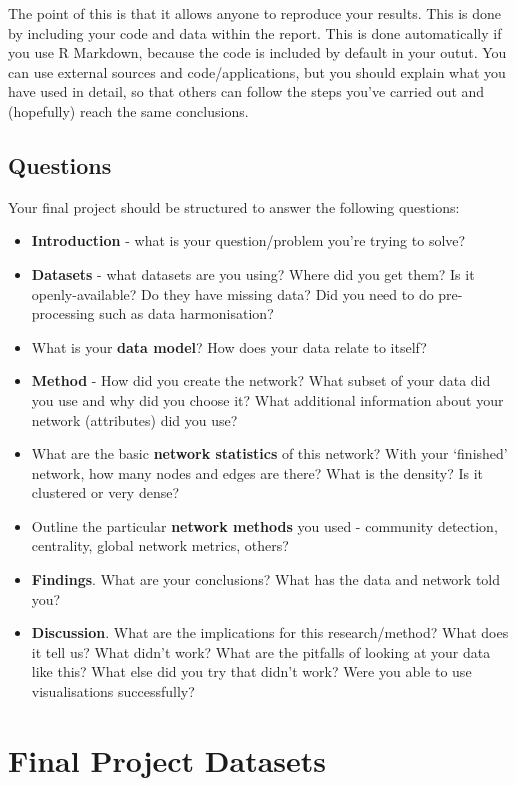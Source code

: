 \documentclass[
]{book}
\begin{document}
The point of this is that it allows anyone to reproduce your results. This is done by including your code and data within the report. This is done automatically if you use R Markdown, because the code is included by default in your outut. You can use external sources and code/applications, but you should explain what you have used in detail, so that others can follow the steps you've carried out and (hopefully) reach the same conclusions.

\hypertarget{questions}{%
\subsection{Questions}\label{questions}}

Your final project should be structured to answer the following questions:

\begin{itemize}
\item
  \textbf{Introduction} - what is your question/problem you're trying to solve?
\item
  \textbf{Datasets} - what datasets are you using? Where did you get them? Is it openly-available? Do they have missing data? Did you need to do pre-processing such as data harmonisation?
\item
  What is your \textbf{data model}? How does your data relate to itself?
\item
  \textbf{Method} - How did you create the network? What subset of your data did you use and why did you choose it? What additional information about your network (attributes) did you use?
\item
  What are the basic \textbf{network statistics} of this network? With your `finished' network, how many nodes and edges are there? What is the density? Is it clustered or very dense?
\item
  Outline the particular \textbf{network methods} you used - community detection, centrality, global network metrics, others?
\item
  \textbf{Findings}. What are your conclusions? What has the data and network told you?
\item
  \textbf{Discussion}. What are the implications for this research/method? What does it tell us? What didn't work? What are the pitfalls of looking at your data like this? What else did you try that didn't work? Were you able to use visualisations successfully?
\end{itemize}

\hypertarget{final-project-datasets}{%
\section{Final Project Datasets}\label{final-project-datasets}}
\end{document}
